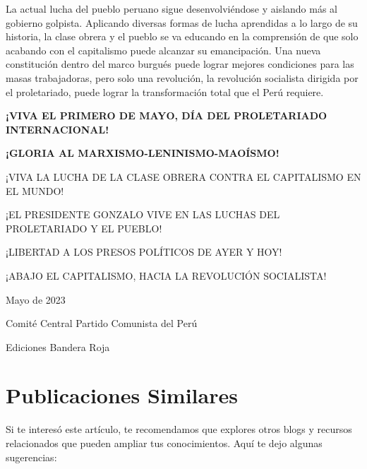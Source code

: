 \documentclass[
  jou,
  floatsintext,
  longtable,
  a4paper,
  nolmodern,
  notxfonts,
  notimes,
  12pt,
  colorlinks=true,linkcolor=blue,citecolor=blue,urlcolor=blue]{apa7}
\begin{document}
La actual lucha del pueblo peruano sigue desenvolviéndose y aislando más
al gobierno golpista. Aplicando diversas formas de lucha aprendidas a lo
largo de su historia, la clase obrera y el pueblo se va educando en la
comprensión de que solo acabando con el capitalismo puede alcanzar su
emancipación. Una nueva constitución dentro del marco burgués puede
lograr mejores condiciones para las masas trabajadoras, pero solo una
revolución, la revolución socialista dirigida por el proletariado, puede
lograr la transformación total que el Perú requiere.

\textbf{¡VIVA EL PRIMERO DE MAYO, DÍA DEL PROLETARIADO INTERNACIONAL!}

\textbf{¡GLORIA AL MARXISMO-LENINISMO-MAOÍSMO!}

¡VIVA LA LUCHA DE LA CLASE OBRERA CONTRA EL CAPITALISMO EN EL MUNDO!

¡EL PRESIDENTE GONZALO VIVE EN LAS LUCHAS DEL PROLETARIADO Y EL PUEBLO!

¡LIBERTAD A LOS PRESOS POLÍTICOS DE AYER Y HOY!

¡ABAJO EL CAPITALISMO, HACIA LA REVOLUCIÓN SOCIALISTA!

Mayo de 2023

Comité Central Partido Comunista del Perú

Ediciones Bandera Roja

\section{Publicaciones Similares}\label{publicaciones-similares}

Si te interesó este artículo, te recomendamos que explores otros blogs y
recursos relacionados que pueden ampliar tus conocimientos. Aquí te dejo
algunas sugerencias:
\end{document}
